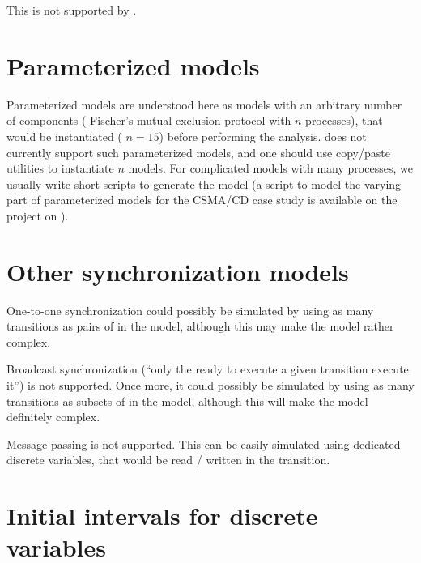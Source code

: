 This is not supported by \imitator{}. %



\section{Parameterized models}

Parameterized models are understood here as models with an arbitrary number of components (\eg{} Fischer's mutual exclusion protocol with $n$ processes), that would be instantiated (\eg{} $n = 15$) before performing the analysis.
\imitator{} does not currently support such parameterized models, and one should use copy/paste utilities to instantiate $n$ models.
For complicated models with many processes, we usually write short scripts to generate the model (a script  to model the varying part of parameterized models for the CSMA/CD case study is available on the \imitator{} project on \GitHubIMI{}).




\section{Other synchronization models}

One-to-one synchronization could possibly be simulated by using as many transitions as pairs of \IPTA{} in the model, although this may make the model rather complex.



Broadcast synchronization (``only the \IPTA{} ready to execute a given transition execute it'') is not supported.
Once more, it could possibly be simulated by using as many transitions as subsets of \IPTA{} in the model, although this will make the model definitely complex.



Message passing is not supported.
This can be easily simulated using dedicated discrete variables, that would be read / written in the transition.



\section{Initial intervals for discrete variables}

